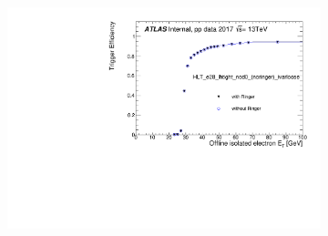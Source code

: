 \begin{figure}[h!tb]
  \begin{center}
  \begin{subfigure}[c]{.59\textwidth}
  \centering
  \includegraphics[width=\textwidth]{sections/04_operation/figures/efficiencies/eff_EGAM1_e28_ringer_and_noringer_2017_after_ts1_HLT_et.pdf}
  \caption{}%


\end{subfigure}
\end{center}
\end{figure}
